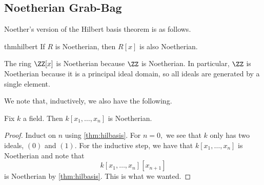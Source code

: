 \documentclass[../notes.tex]{subfiles}
\begin{document}
\subsection{Noetherian Grab-Bag}
Noether's version of the Hilbert basis theorem is as follows.
\begin{restatable}{thm}{hilbert} \label{thm:hilbasis}
	If $R$ is Noetherian, then $R[x]$ is also Noetherian.
\end{restatable}
\begin{ex}
	The ring $\ZZ[x]$ is Noetherian because $\ZZ$ is Noetherian. In particular, $\ZZ$ is Noetherian because it is a principal ideal domain, so all ideals are generated by a single element.
\end{ex}
We note that, inductively, we also have the following.
\begin{cor}
	Fix $k$ a field. Then $k[x_1,\ldots,x_n]$ is Noetherian.
\end{cor}
\begin{proof}
	Induct on $n$ using \autoref{thm:hilbasis}. For $n=0,$ we see that $k$ only has two ideals, $(0)$ and $(1).$ For the inductive step, we have that $k[x_1,\ldots,x_n]$ is Noetherian and note that
	\[k[x_1,\ldots,x_n][x_{n+1}]\]
	is Noetherian by \autoref{thm:hilbasis}. This is what we wanted.
\end{proof}
\end{document}
